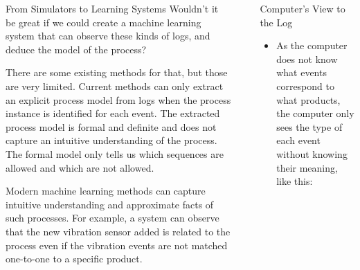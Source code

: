 \documentclass[final,xcolor={usenames,x11names}]{beamer}
\newlength{\sepwid}
\newlength{\onecolwid}
\begin{document}
\begin{frame}[t]
\begin{columns}[t]
\begin{column}{\onecolwid}
\begin{block}{From Simulators to Learning Systems}
Wouldn't it be great if we could create a machine learning system that can observe these kinds of logs, and deduce the model of the process?

There are some existing methods for that, but those are very limited. Current methods can only extract an explicit process model
from logs when the process instance is identified for each event. The extracted process model is formal and definite and does not capture
an intuitive understanding of the process. The formal model only tells us which sequences are allowed and which are not allowed.

Modern machine learning methods can capture intuitive understanding and approximate facts of such processes. For example, a system can observe that the new vibration sensor added is related to the process
even if the vibration events are not matched one-to-one to a specific product.
\end{block}

\end{column}
\begin{column}{\sepwid}\end{column} %

\begin{column}{\onecolwid}

\begin{alertblock}{Computer's View to the Log}

\begin{itemize}
\item As the computer does not know what events correspond to what products, the computer only sees the type of each event without knowing their meaning, like this:
\end{itemize}


\end{alertblock}
\end{column}
\end{columns}
\end{frame}
\end{document}
